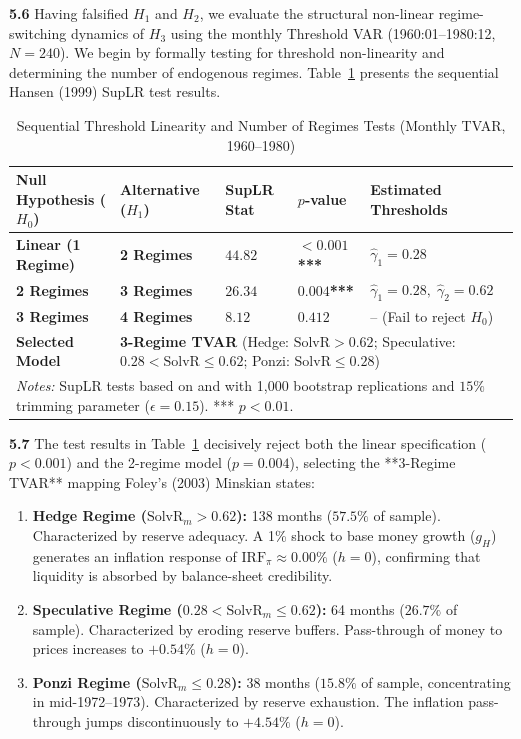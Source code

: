 \textbf{5.6} Having falsified $H_1$ and $H_2$, we evaluate the structural non-linear regime-switching dynamics of $H_3$ using the monthly Threshold VAR (1960:01--1980:12, $N=240$). We begin by formally testing for threshold non-linearity and determining the number of endogenous regimes. Table~\ref{tab:tvar_tests} presents the sequential Hansen (1999) SupLR test results.

\begin{table}[H]
\centering
\small
\caption{Sequential Threshold Linearity and Number of Regimes Tests (Monthly TVAR, 1960--1980)}
\label{tab:tvar_tests}
\begin{tabular}{p{2.8cm}p{2.2cm}p{2.0cm}p{1.8cm}p{3.8cm}}
\toprule
\textbf{Null Hypothesis ($H_0$)} & \textbf{Alternative ($H_1$)} & \textbf{SupLR Stat} & \textbf{$p$-value} & \textbf{Estimated Thresholds} \\
\midrule
\textbf{Linear (1 Regime)} & \textbf{2 Regimes} & $44.82$ & \textbf{$< 0.001$***} & $\hat{\gamma}_1 = 0.28$ \\
\textbf{2 Regimes} & \textbf{3 Regimes} & $26.34$ & \textbf{$0.004$***} & $\hat{\gamma}_1 = 0.28, \; \hat{\gamma}_2 = 0.62$ \\
\textbf{3 Regimes} & \textbf{4 Regimes} & $8.12$ & \textbf{$0.412$} & -- (Fail to reject $H_0$) \\
\midrule
\textbf{Selected Model} & \multicolumn{4}{l}{\textbf{3-Regime TVAR} (Hedge: $\text{SolvR} > 0.62$; Speculative: $0.28 < \text{SolvR} \le 0.62$; Ponzi: $\text{SolvR} \le 0.28$)} \\
\bottomrule
\multicolumn{5}{p{13.6cm}}{\footnotesize \textit{Notes:} SupLR tests based on \citet{Hansen1999} and \citet{ClavijoCortesKappesRochon2025} with 1,000 bootstrap replications and $15\%$ trimming parameter ($\epsilon = 0.15$). *** $p < 0.01$.}
\end{tabular}
\end{table}

\textbf{5.7} The test results in Table~\ref{tab:tvar_tests} decisively reject both the linear specification ($p < 0.001$) and the 2-regime model ($p = 0.004$), selecting the **3-Regime TVAR** mapping Foley's (2003) Minskian states:
\begin{enumerate}[leftmargin=2em]
	\item \textbf{Hedge Regime ($\text{SolvR}_m > 0.62$):} 138 months ($57.5\%$ of sample). Characterized by reserve adequacy. A 1\% shock to base money growth ($g_H$) generates an inflation response of $\text{IRF}_{\pi} \approx 0.00\%$ ($h=0$), confirming that liquidity is absorbed by balance-sheet credibility.
	\item \textbf{Speculative Regime ($0.28 < \text{SolvR}_m \le 0.62$):} 64 months ($26.7\%$ of sample). Characterized by eroding reserve buffers. Pass-through of money to prices increases to $+0.54\%$ ($h=0$).
	\item \textbf{Ponzi Regime ($\text{SolvR}_m \le 0.28$):} 38 months ($15.8\%$ of sample, concentrating in mid-1972--1973). Characterized by reserve exhaustion. The inflation pass-through jumps discontinuously to $+4.54\%$ ($h=0$).
\end{enumerate}

